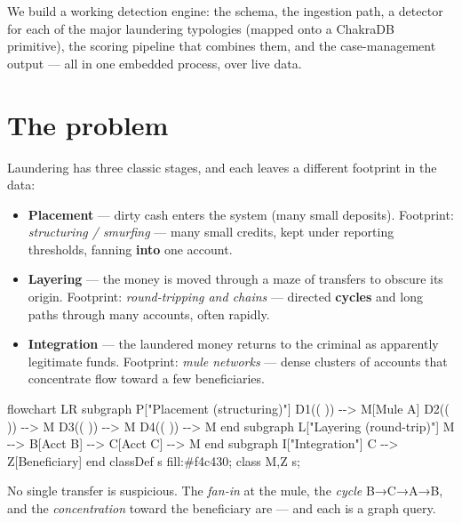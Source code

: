 \documentclass[
  11pt,
  openany]{book}
\newenvironment{Shaded}{}{}
\newcommand{\NormalTok}[1]{#1}
\providecommand{\tightlist}{%
  \setlength{\itemsep}{0pt}\setlength{\parskip}{0pt}}
\begin{document}
We build a working detection engine: the schema, the ingestion path, a
detector for each of the major laundering typologies (mapped onto a
ChakraDB primitive), the scoring pipeline that combines them, and the
case-management output --- all in one embedded process, over live data.

\section{The problem}\label{the-problem}

Laundering has three classic stages, and each leaves a different
footprint in the data:

\begin{itemize}
\tightlist
\item
  \textbf{Placement} --- dirty cash enters the system (many small
  deposits). Footprint: \emph{structuring / smurfing} --- many small
  credits, kept under reporting thresholds, fanning \textbf{into} one
  account.
\item
  \textbf{Layering} --- the money is moved through a maze of transfers
  to obscure its origin. Footprint: \emph{round-tripping and chains} ---
  directed \textbf{cycles} and long paths through many accounts, often
  rapidly.
\item
  \textbf{Integration} --- the laundered money returns to the criminal
  as apparently legitimate funds. Footprint: \emph{mule networks} ---
  dense clusters of accounts that concentrate flow toward a few
  beneficiaries.
\end{itemize}

\begin{Shaded}
\begin{Highlighting}[]
\NormalTok{flowchart LR}
\NormalTok{    subgraph P["Placement (structuring)"]}
\NormalTok{      D1(( )) {-}{-}\textgreater{} M[Mule A]}
\NormalTok{      D2(( )) {-}{-}\textgreater{} M}
\NormalTok{      D3(( )) {-}{-}\textgreater{} M}
\NormalTok{      D4(( )) {-}{-}\textgreater{} M}
\NormalTok{    end}
\NormalTok{    subgraph L["Layering (round{-}trip)"]}
\NormalTok{      M {-}{-}\textgreater{} B[Acct B] {-}{-}\textgreater{} C[Acct C] {-}{-}\textgreater{} M}
\NormalTok{    end}
\NormalTok{    subgraph I["Integration"]}
\NormalTok{      C {-}{-}\textgreater{} Z[Beneficiary]}
\NormalTok{    end}
\NormalTok{    classDef s fill:\#f4c430; class M,Z s;}
\end{Highlighting}
\end{Shaded}

No single transfer is suspicious. The \emph{fan-in} at the mule, the
\emph{cycle} B→C→A→B, and the \emph{concentration} toward the
beneficiary are --- and each is a graph query.
\end{document}
